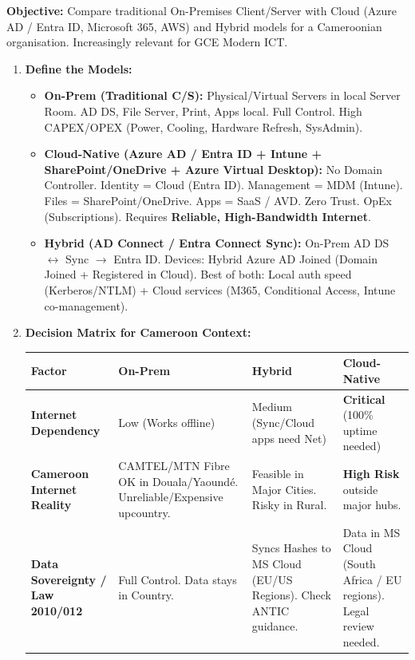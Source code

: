 \documentclass[11pt]{article}
\begin{document}
\begin{methode}
\textbf{Objective:} Compare traditional On-Premises Client/Server with Cloud (Azure AD / Entra ID, Microsoft 365, AWS) and Hybrid models for a Cameroonian organisation. Increasingly relevant for GCE Modern ICT.

\begin{enumerate}
    \item \textbf{Define the Models:}
    \begin{itemize}
        \item \textbf{On-Prem (Traditional C/S):} Physical/Virtual Servers in local Server Room. AD DS, File Server, Print, Apps local. Full Control. High CAPEX/OPEX (Power, Cooling, Hardware Refresh, SysAdmin).
        \item \textbf{Cloud-Native (Azure AD / Entra ID + Intune + SharePoint/OneDrive + Azure Virtual Desktop):} No Domain Controller. Identity = Cloud (Entra ID). Management = MDM (Intune). Files = SharePoint/OneDrive. Apps = SaaS / AVD. Zero Trust. OpEx (Subscriptions). Requires \textbf{Reliable, High-Bandwidth Internet}.
        \item \textbf{Hybrid (AD Connect / Entra Connect Sync):} On-Prem AD DS $\leftrightarrow$ Sync $\rightarrow$ Entra ID. Devices: Hybrid Azure AD Joined (Domain Joined + Registered in Cloud). Best of both: Local auth speed (Kerberos/NTLM) + Cloud services (M365, Conditional Access, Intune co-management).
    \end{itemize}
    \item \textbf{Decision Matrix for Cameroon Context:}
    \begin{center}
    \begin{tabularx}{\linewidth}{|l|X|X|X|}
    \hline
    \rowcolor{popblueL}
    \textbf{Factor} & \textbf{On-Prem} & \textbf{Hybrid} & \textbf{Cloud-Native} \\
    \hline
    \textbf{Internet Dependency} & Low (Works offline) & Medium (Sync/Cloud apps need Net) & \textbf{Critical} (100\% uptime needed) \\
    \hline
    \textbf{Cameroon Internet Reality} & CAMTEL/MTN Fibre OK in Douala/Yaoundé. Unreliable/Expensive upcountry. & Feasible in Major Cities. Risky in Rural. & \textbf{High Risk} outside major hubs. \\
    \hline
    \textbf{Data Sovereignty / Law 2010/012} & Full Control. Data stays in Country. & Syncs Hashes to MS Cloud (EU/US Regions). Check ANTIC guidance. & Data in MS Cloud (South Africa / EU regions). Legal review needed. \\

\end{tabularx}
\end{center}
\end{enumerate}
\end{methode}
\end{document}
